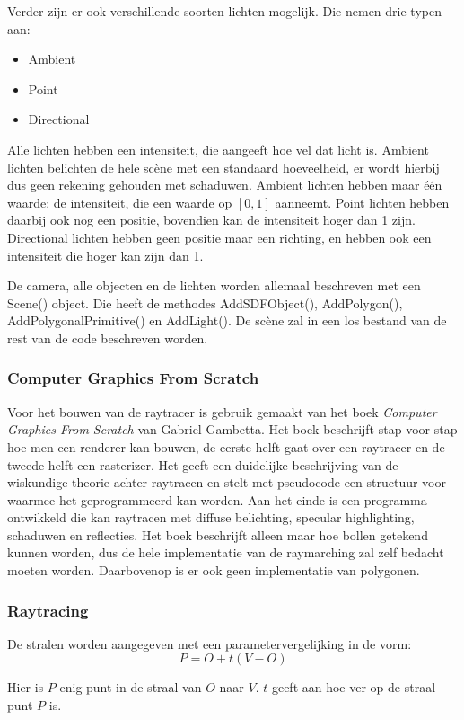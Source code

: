 \documentclass[12pt, a4paper]{article}
\begin{document}
Verder zijn er ook verschillende soorten lichten mogelijk. Die nemen drie typen aan:
\begin{itemize}
	\item Ambient
	\item Point
	\item Directional
\end{itemize}
Alle lichten hebben een intensiteit, die aangeeft hoe vel dat licht is. Ambient lichten belichten de hele scène met een standaard hoeveelheid, er wordt hierbij dus geen rekening gehouden met schaduwen. Ambient lichten hebben maar één waarde: de intensiteit, die een waarde op \([0, 1]\) aanneemt. Point lichten hebben daarbij ook nog een positie, bovendien kan de intensiteit hoger dan 1 zijn. Directional lichten hebben geen positie maar een richting, en hebben ook een intensiteit die hoger kan zijn dan 1.

De camera, alle objecten en de lichten worden allemaal beschreven met een Scene() object. Die heeft de methodes AddSDFObject(), AddPolygon(), AddPolygonalPrimitive() en AddLight(). De scène zal in een los bestand van de rest van de code beschreven worden.
\subsubsection{Computer Graphics From Scratch}
Voor het bouwen van de raytracer is gebruik gemaakt van het boek \emph{Computer Graphics From Scratch} \cite{ComputerGraphicsFromScratch} van Gabriel Gambetta. Het boek beschrijft stap voor stap hoe men een renderer kan bouwen, de eerste helft gaat over een raytracer en de tweede helft een rasterizer. Het geeft een duidelijke beschrijving van de wiskundige theorie achter raytracen en stelt met pseudocode een structuur voor waarmee het geprogrammeerd kan worden. Aan het einde is een programma ontwikkeld die kan raytracen met diffuse belichting, specular highlighting, schaduwen en reflecties. Het boek beschrijft alleen maar hoe bollen getekend kunnen worden, dus de hele implementatie van de raymarching zal zelf bedacht moeten worden. Daarbovenop is er ook geen implementatie van polygonen. 
\subsubsection{Raytracing}
De stralen worden aangegeven met een parametervergelijking in de vorm:
\[P=O+t(V-O)\]

Hier is $P$ enig punt in de straal van $O$ naar $V$. $t$ geeft aan hoe ver op de straal punt $P$ is.
\end{document}
